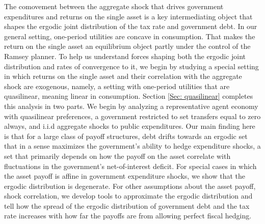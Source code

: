 \documentclass[thmsb,11pt]{article}
\begin{document}
The comovement between the aggregate shock that drives government expenditures and returns
on the single asset is a key intermediating object that shapes the ergodic joint distribution of the tax rate and government debt.  In our general setting, one-period utilities are concave in consumption. That makes  the return on the single asset an equilibrium object partly under the control of the Ramsey planner.
 To help us understand forces shaping both the ergodic joint distribution and rates of convergence to it,  we begin by
studying a special setting in which returns on the single asset and their correlation with the aggregate shock are exogenous, namely,
a setting with one-period utilities  that are quasilinear, meaning linear in consumption.
Section \ref{Sec: quasilinear} completes this  analysis in two parts. We begin by analyzing
a representative agent economy with quasilinear preferences, a government restricted to set transfers equal to zero always, and i.i.d aggregate shocks to public expenditures.
  Our main finding here is  that for a large class of payoff structures,
debt  drifts towards an ergodic set that in a sense maximizes the  government's ability to hedge expenditure shocks,  a set
that  primarily depends on how the payoff on the asset  correlate with  fluctuations in the
 government's net-of-interest deficit. 
For special cases in which the asset payoff is affine in government expenditure shocks, we
show that the ergodic distribution is degenerate. For other assumptions about the asset payoff, shock correlation, we develop tools to approximate the ergodic distribution
 and tell  how the spread of the ergodic distribution of government  debt and the tax rate increases with how far the payoffs  are from allowing perfect fiscal hedging.
\end{document}
